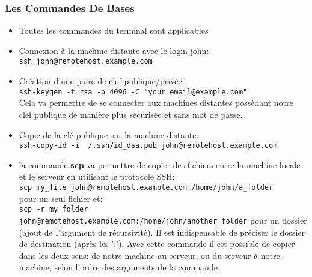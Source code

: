 \subsubsection{Les Commandes De Bases}
\begin{itemize}
	\item Toutes les commandes du terminal sont applicables
	\item Connexion à la machine distante avec le login john:\\
		\texttt{ssh john@remotehost.example.com}
	\item Création d'une paire de clef publique/privée:\\
		\texttt{ssh-keygen -t rsa -b 4096 -C "your_email@example.com"}\\
		Cela va permettre de se connecter aux machines distantes possédant
		notre clef publique de manière plus sécurisée et sans mot de passe.
	\item Copie de la clé publique sur la machine distante:\\
		\texttt{ssh-copy-id -i ~/.ssh/id_dsa.pub john@remotehost.example.com}
	\item la commande \textbf{scp} va permettre de copier des fichiers entre la machine locale et le
		serveur en utilisant le protocole SSH:\\
		\texttt{scp my_file john@remotehost.example.com:/home/john/a_folder}\\
		pour un seul fichier et:\\
		\texttt{scp -r my_folder john@remotehost.example.com:/home/john/another_folder} pour un dossier
		(ajout de l’argument de récursivité). Il est indispensable de préciser le
		dossier de destination (après les ':'). Avec cette commande il est
		possible de copier dans les deux sens: de notre machine au serveur, ou
		du serveur à notre machine, selon l'ordre des arguments de la commande.
\end{itemize}
